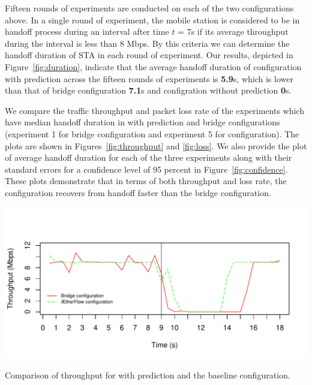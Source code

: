Fifteen rounds of experiments are conducted on each of the two configurations
above. In a single round of experiment, the mobile station is considered to be
in handoff process during an interval after time $t$ = 7s if its average
throughput during the interval is less than 8 Mbps. By this criteria we can
determine the handoff duration of STA in each round of experiment. Our results, depicted  in Figure~\ref{fig:duration}, indicate that the average handoff
duration of \aetherflow configuration with prediction across the fifteen rounds of experiments is
\textbf{5.9}s, which is lower than that of bridge configuration \textbf{7.1}s and \aetherflow configration without prediction \textbf{0}s.

We compare the traffic throughput and packet loss rate of the experiments
which have median handoff duration in \aetherflow with prediction and bridge configurations (experiment 1 for
bridge configuration and experiment 5 for \aetherflow configuration). 
The plots are shown in Figures~\ref{fig:throughput} and \ref{fig:loss}. We also provide the plot of average handoff duration for each of the three experiments along with their standard errors for a confidence level of 95 percent in Figure~\ref{fig:confidence}.
These plots demonstrate that in terms of both throughput and loss rate, the \aetherflow
configuration recovers from handoff faster than the bridge configuration. 

\begin{table}
\centering
\includegraphics[width=.8\textwidth]{figures/throughput}
\caption{Comparison of throughput for \aetherflow with prediction and the baseline configuration.} %
\label{fig:throughput}
\end{table}

